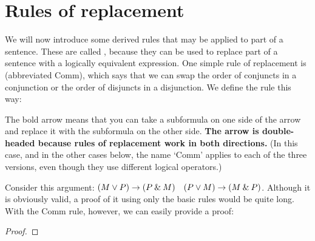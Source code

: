 
\section{Rules of replacement}

We will now introduce some derived rules that may be applied to part of a sentence. These are called , because they can be used to replace part of a sentence with a logically equivalent expression. One simple rule of replacement is  (abbreviated Comm), which says that we can swap the order of conjuncts in a conjunction or the order of disjuncts in a disjunction. We define the rule this way:

The bold arrow means that you can take a subformula on one side of the arrow and replace it with the subformula on the other side. \textbf{The arrow is double-headed because rules of replacement work in both directions.} (In this case, and in the other cases below, the name `Comm' applies to each of the three versions, even though they use different logical operators.)

Consider this argument: $(M \vee P) \rightarrow (P \mathbin{\&} M)$ \therefore\ $(P \vee M) \rightarrow (M \mathbin{\&} P)$. Although it is obviously valid, a proof of it using only the basic rules would be quite long. With the Comm rule, however, we can easily provide a proof:

\begin{proof}
	 
\end{proof}

 %

